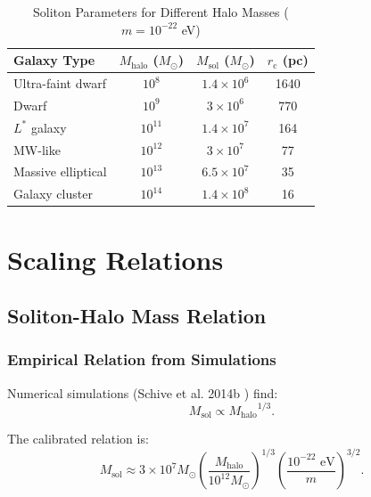 \documentclass[11pt,a4paper]{article}
\newcommand{\Msun}{\ensuremath{M_\odot}}
\newcommand{\Msol}{\ensuremath{M_{\mathrm{sol}}}}
\newcommand{\Mhalo}{\ensuremath{M_{\mathrm{halo}}}}
\newcommand{\rc}{\ensuremath{r_{\mathrm{c}}}}
\theoremstyle{definition}
\theoremstyle{remark}
\begin{document}
\begin{table}[H]
\centering
\caption{Soliton Parameters for Different Halo Masses ($m = 10^{-22}$ eV)}
\label{tab:soliton_params}
\begin{tabular}{@{}lccc@{}}
\toprule
\textbf{Galaxy Type} & $\Mhalo$ ($\Msun$) & $\Msol$ ($\Msun$) & $\rc$ (pc) \\
\midrule
Ultra-faint dwarf & $10^8$ & $1.4 \times 10^6$ & 1640 \\
Dwarf & $10^9$ & $3 \times 10^6$ & 770 \\
$L^*$ galaxy & $10^{11}$ & $1.4 \times 10^7$ & 164 \\
MW-like & $10^{12}$ & $3 \times 10^7$ & 77 \\
Massive elliptical & $10^{13}$ & $6.5 \times 10^7$ & 35 \\
Galaxy cluster & $10^{14}$ & $1.4 \times 10^8$ & 16 \\
\bottomrule
\end{tabular}
\end{table}

\section{Scaling Relations}
\label{sec:scaling}

\subsection{Soliton-Halo Mass Relation}
\label{sec:soliton_halo}

\subsubsection{Empirical Relation from Simulations}

Numerical simulations (Schive et al. 2014b \cite{Schive2014b}) find:
\begin{equation}
\label{eq:soliton_halo}
\boxed{\Msol \propto \Mhalo^{1/3}.}
\end{equation}

The calibrated relation is:
\begin{equation}
\Msol \approx 3 \times 10^7 \Msun \left(\frac{\Mhalo}{10^{12} \Msun}\right)^{1/3} \left(\frac{10^{-22}\text{ eV}}{m}\right)^{3/2}.
\end{equation}
\end{document}
